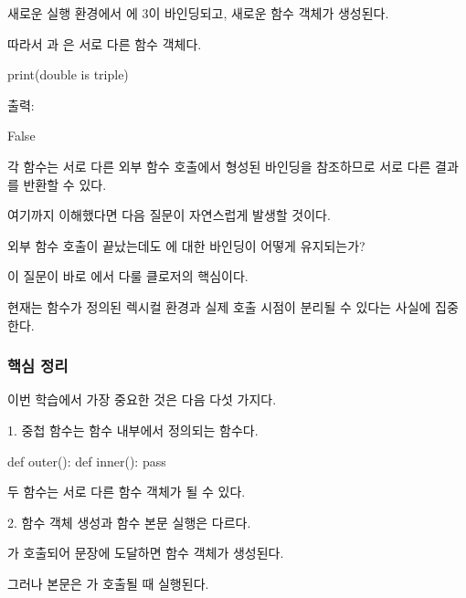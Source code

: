 새로운 실행 환경에서 에 3이 바인딩되고, 새로운  함수 객체가 생성된다.

따라서 과 은 서로 다른 함수 객체다.

\begin{dhkcode}
print(double is triple)
\end{dhkcode}

출력:

\begin{dhkzsh}
False
\end{dhkzsh}

각 함수는 서로 다른 외부 함수 호출에서 형성된 바인딩을 참조하므로 서로 다른 결과를 반환할 수 있다.

여기까지 이해했다면 다음 질문이 자연스럽게 발생할 것이다.

외부 함수 호출이 끝났는데도 에 대한 바인딩이 어떻게 유지되는가?

이 질문이 바로 에서 다룰 클로저의 핵심이다.

현재는 함수가 정의된 렉시컬 환경과 실제 호출 시점이 분리될 수 있다는 사실에 집중한다.

\subsubsection{핵심 정리}

이번 학습에서 가장 중요한 것은 다음 다섯 가지다.

\begin{dhknote}
\begin{dhksmry}[centered]
1. 중첩 함수는 함수 내부에서 정의되는 함수다.
\end{dhksmry}
\end{dhknote}

\begin{dhkcode}
def outer():
    def inner():
        pass
\end{dhkcode}

두 함수는 서로 다른 함수 객체가 될 수 있다.

\begin{dhknote}
\begin{dhksmry}[centered]
2. 함수 객체 생성과 함수 본문 실행은 다르다.
\end{dhksmry}
\end{dhknote}

가 호출되어  문장에 도달하면  함수 객체가 생성된다.

그러나  본문은 가 호출될 때 실행된다.

